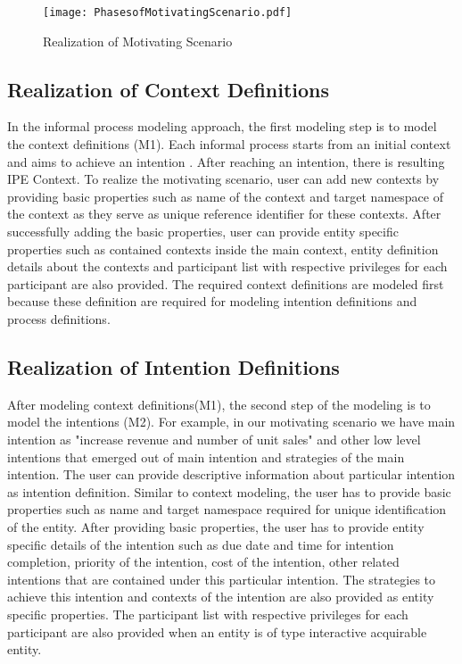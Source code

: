 \begin{figure}
	\centering
	\texttt{[image: PhasesofMotivatingScenario.pdf]}
	\caption{Realization of Motivating Scenario}
	\label{fig:realizationofmotivatingscenario}
\end{figure}

\subsection{Realization of Context Definitions}
In the informal process modeling approach, the first modeling step is to model the context definitions (M1). Each informal process starts from an initial context and aims to achieve an intention \cite{Sungur2014a}. After reaching an intention, there is resulting IPE Context. To realize the motivating scenario, user can add new contexts by providing basic properties such as name of the context and target namespace of the context as they serve as unique reference identifier for these contexts. After successfully adding the basic properties, user can provide entity specific properties such as contained contexts inside the main context, entity definition details about the contexts and participant list with respective privileges for each participant are also provided. The required context definitions are modeled first because these definition are required for modeling intention definitions and process definitions.  

\subsection{Realization of Intention Definitions}
After modeling context definitions(M1), the second step of the modeling is to model the intentions (M2). For example, in our motivating scenario we have main intention as "increase revenue and number of unit sales" and other low level intentions that emerged out of main intention and strategies of the main intention. The user can provide descriptive information about particular intention as intention definition. Similar to context modeling, the user has to provide basic properties such as name and target namespace required for unique identification of the entity. After providing basic properties, the user has to provide entity specific details of the intention such as due date and time for intention completion, priority of the intention, cost of the intention, other related intentions that are contained under this particular intention. The strategies to achieve this intention and contexts of the intention are also provided as entity specific properties. The participant list with respective privileges for each participant are also provided when an entity is of type interactive acquirable entity. 

